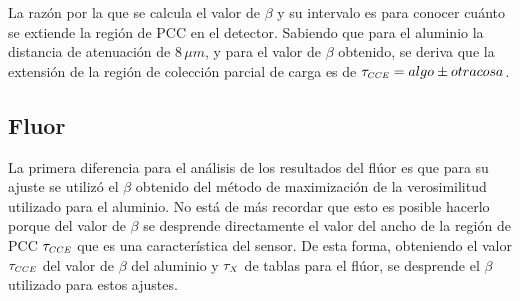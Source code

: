 La razón por la que se calcula el valor de $\beta$ y su intervalo es para conocer cuánto se extiende la región de PCC en el detector. Sabiendo que para el aluminio la distancia de atenuación de $8\,\si{\mu m}$, y para el valor de $\beta$ obtenido, se deriva que la extensión de la región de colección parcial de carga es de $\tau_{\scaleto{CCE}{4pt}} = algo \pm otra cosa$.

\subsection{Fluor}
\noindent La primera diferencia para el análisis de los resultados del flúor es que para su ajuste se utilizó el $\beta$ obtenido del método de maximización de la verosimilitud utilizado para el aluminio. No está de más recordar que esto es posible hacerlo porque del valor de $\beta$ se desprende directamente el valor del ancho de la región de PCC $\tau_{\scaleto{CCE}{4pt}}$ que es una característica del sensor. De esta forma, obteniendo el valor $\tau_{\scaleto{CCE}{4pt}}$ del valor de $\beta$ del aluminio y $\tau_{\scaleto{X}{4pt}}$ de tablas para el flúor, se desprende el $\beta$ utilizado para estos ajustes.


